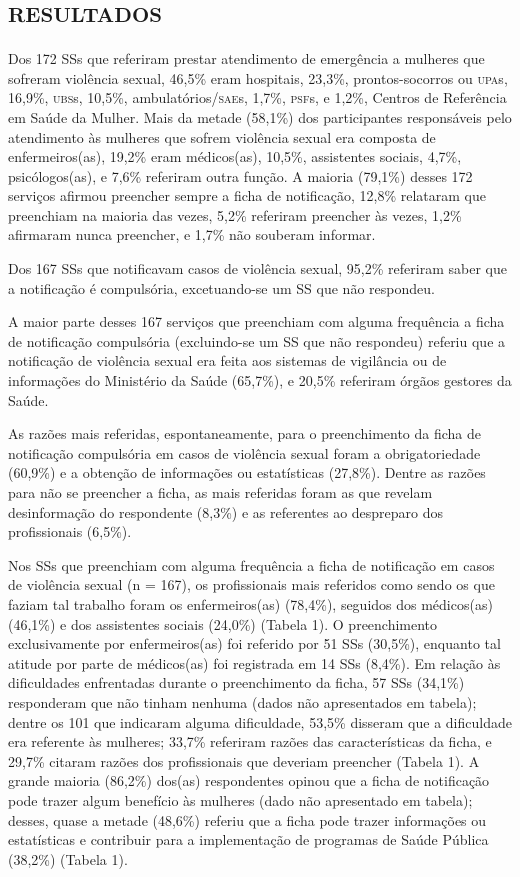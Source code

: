 \documentclass{article}
\begin{document}
\section{\textsc{resultados}}

Dos 172 SSs que referiram prestar atendimento de emergência a mulheres que
sofreram violência sexual, 46,5\% eram hospitais, 23,3\%, prontos-socorros ou
\textsc{upa}s, 16,9\%, \textsc{ubs}s, 10,5\%, ambulatórios/\textsc{sae}s, 1,7\%, \textsc{psf}s, e 1,2\%, Centros de
Referência em Saúde da Mulher. Mais da metade (58,1\%) dos participantes
responsáveis pelo atendimento às mulheres que sofrem violência sexual era
composta de enfermeiros(as), 19,2\% eram médicos(as), 10,5\%, assistentes
sociais, 4,7\%, psicólogos(as), e 7,6\% referiram outra função. A maioria
(79,1\%) desses 172 serviços afirmou preencher sempre a ficha de notificação,
12,8\% relataram que preenchiam na maioria das vezes, 5,2\% referiram preencher
às vezes, 1,2\% afirmaram nunca preencher, e 1,7\% não souberam informar.

Dos 167 SSs que notificavam casos de violência sexual, 95,2\% referiram saber
que a notificação é compulsória, excetuando-se um SS que não respondeu.

A maior parte desses 167 serviços que preenchiam com alguma frequência a ficha
de notificação compulsória (excluindo-se um SS que não respondeu) referiu que a
notificação de violência sexual era feita aos sistemas de vigilância ou de
informações do Ministério da Saúde (65,7\%), e 20,5\% referiram órgãos gestores
da Saúde.

As razões mais referidas, espontaneamente, para o preenchimento da ficha de
notificação compulsória em casos de violência sexual foram a obrigatoriedade
(60,9\%) e a obtenção de informações ou estatísticas (27,8\%). Dentre as razões
para não se preencher a ficha, as mais referidas foram as que revelam
desinformação do respondente (8,3\%) e as referentes ao despreparo dos
profissionais (6,5\%).

Nos SSs que preenchiam com alguma frequência a ficha de notificação em casos de
violência sexual (n = 167), os profissionais mais referidos como sendo os que
faziam tal trabalho foram os enfermeiros(as) (78,4\%), seguidos dos médicos(as)
(46,1\%) e dos assistentes sociais (24,0\%) (Tabela 1). O preenchimento
exclusivamente por enfermeiros(as) foi referido por 51 SSs (30,5\%), enquanto
tal atitude por parte de médicos(as) foi registrada em 14 SSs (8,4\%). Em
relação às dificuldades enfrentadas durante o preenchimento da ficha, 57 SSs
(34,1\%) responderam que não tinham nenhuma (dados não apresentados em tabela);
dentre os 101 que indicaram alguma dificuldade, 53,5\% disseram que a
dificuldade era referente às mulheres; 33,7\% referiram razões das
características da ficha, e 29,7\% citaram razões dos profissionais que deveriam
preencher (Tabela 1). A grande maioria (86,2\%) dos(as) respondentes opinou que
a ficha de notificação pode trazer algum benefício às mulheres (dado não
apresentado em tabela); desses, quase a metade (48,6\%) referiu que a ficha pode
trazer informações ou estatísticas e contribuir para a implementação de
programas de Saúde Pública (38,2\%) (Tabela 1).
\end{document}

